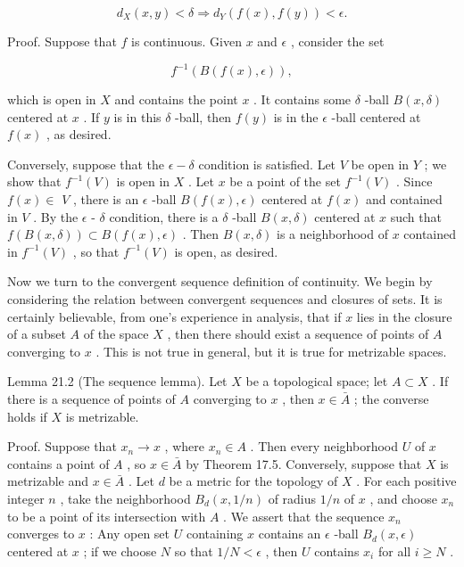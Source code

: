 \[
{d}_{X}\left( {x,y}\right)  < \delta  \Rightarrow  {d}_{Y}\left( {f\left( x\right) ,f\left( y\right) }\right)  < \epsilon .
\]

Proof. Suppose that \(f\) is continuous. Given \(x\) and \(\epsilon\) , consider the set

\[
{f}^{-1}\left( {B\left( {f\left( x\right) ,\epsilon }\right) }\right) ,
\]

which is open in \(X\) and contains the point \(x\) . It contains some \(\delta\) -ball \(B\left( {x,\delta }\right)\) centered at \(x\) . If \(y\) is in this \(\delta\) -ball, then \(f\left( y\right)\) is in the \(\epsilon\) -ball centered at \(f\left( x\right)\) , as desired.

Conversely, suppose that the \(\epsilon  - \delta\) condition is satisfied. Let \(V\) be open in \(Y\) ; we show that \({f}^{-1}\left( V\right)\) is open in \(X\) . Let \(x\) be a point of the set \({f}^{-1}\left( V\right)\) . Since \(f\left( x\right)  \in\)  \(V\) , there is an \(\epsilon\) -ball \(B\left( {f\left( x\right) ,\epsilon }\right)\) centered at \(f\left( x\right)\) and contained in \(V\) . By the \(\epsilon\) - \(\delta\) condition, there is a \(\delta\) -ball \(B\left( {x,\delta }\right)\) centered at \(x\) such that \(f\left( {B\left( {x,\delta }\right) }\right)  \subset  B\left( {f\left( x\right) ,\epsilon }\right)\) . Then \(B\left( {x,\delta }\right)\) is a neighborhood of \(x\) contained in \({f}^{-1}\left( V\right)\) , so that \({f}^{-1}\left( V\right)\) is open, as desired.

Now we turn to the convergent sequence definition of continuity. We begin by considering the relation between convergent sequences and closures of sets. It is certainly believable, from one’s experience in analysis, that if \(x\) lies in the closure of a subset \(A\) of the space \(X\) , then there should exist a sequence of points of \(A\) converging to \(x\) . This is not true in general, but it is true for metrizable spaces.

Lemma 21.2 (The sequence lemma). Let \(X\) be a topological space; let \(A \subset  X\) . If there is a sequence of points of \(A\) converging to \(x\) , then \(x \in  \bar{A}\) ; the converse holds if \(X\) is metrizable.

Proof. Suppose that \({x}_{n} \rightarrow  x\) , where \({x}_{n} \in  A\) . Then every neighborhood \(U\) of \(x\) contains a point of \(A\) , so \(x \in  \bar{A}\) by Theorem 17.5. Conversely, suppose that \(X\) is metrizable and \(x \in  \bar{A}\) . Let \(d\) be a metric for the topology of \(X\) . For each positive integer \(n\) , take the neighborhood \({B}_{d}\left( {x,1/n}\right)\) of radius \(1/n\) of \(x\) , and choose \({x}_{n}\) to be a point of its intersection with \(A\) . We assert that the sequence \({x}_{n}\) converges to \(x\) : Any open set \(U\) containing \(x\) contains an \(\epsilon\) -ball \({B}_{d}\left( {x,\epsilon }\right)\) centered at \(x\) ; if we choose \(N\) so that \(1/N < \epsilon\) , then \(U\) contains \({x}_{i}\) for all \(i \geq  N\) .

